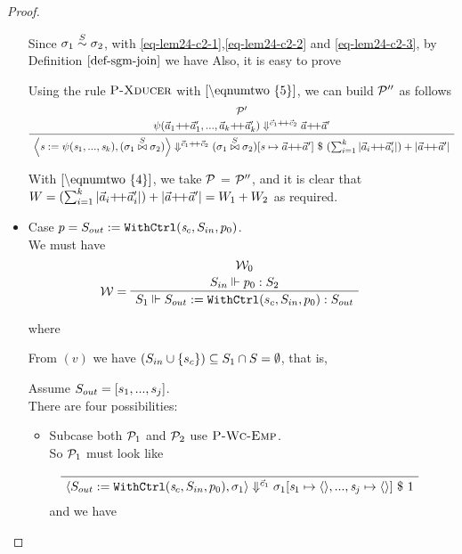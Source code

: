 \begin{proof}
\begin{itemize}
    Since $\sigma_1 \stackrel{S}{\sim} \sigma_2$, 
    with \eqref{eq-lem24-c2-1},\eqref{eq-lem24-c2-2} and \eqref{eq-lem24-c2-3}, 
    by Definition $\ref{def-sgm-join}$ we have
 	Also, it is easy to prove 
 
    Using the rule $\textsc{P-Xducer}$ with $\eqref{\eqnumtwo{5}}$, we can build $\mathcal{P}''$ as follows
   	$$\PT{\UCN{\MP'}{\sevalfg{\lcall}{\a_1  {\++} \a_1',...,\a_k {\++} \a_k' } 
   			{\c_1 {\++} \c_2} {\a {\++} \a'}}
    	\UC{\seval{\casetwo}{\sgmx}{\c_1 {\++} \c_2}{\sgmx[\s \|-> \a {\++} \a']}{(\sum_{i=1}^{k}|\a_i{\++}\a'_i|) + |\a{\++} \a'|}}
    } $$
   
   
    With $\eqref{\eqnumtwo{4}}$, we take $\mathcal{P}$  = $\mathcal{P}''$,
    and it is clear that $W = (\sum_{i=1}^{k}|\a_i{\++}\a'_i|) + |\a{\++} \a'| = W_1 + W_2$ as required.
 
   	

\item Case $p = S_{out} := \mathtt{WithCtrl}(\mathit{s}_c,S_{in},p_0)$.\\
\def\eqnumthree#1{eq-lem24-c3-{#1}}
	We must have  
	$$
		\PT{\UCN{\MW_0}{\wf{p_0}{\Sin}{\S_2}}
			\LeLa{\MW = }		
			\UC{\wf{\withctrl{s_c}{p_0}{\Sin}{\Sout}}{\S_1}{\Sout}}  
	}$$

where  
 
From $(v)$ we have $(S_{in} \cup \{s_c\})  \subseteq S_1 \cap S = \emptyset$, that is,
		
\def\casethree{\withctrl{\s_c}{p_0}{\Sin}{\Sout}}

    Assume $S_{out} = [s_1,...,s_j]$. \\	
    There are four possibilities: 
   
    \begin{itemize}
    	\item Subcase both $\mathcal{P}_1$ and $\mathcal{P}_2$ use $\textsc{P-Wc-Emp}$. \\
    	
    	So $\mathcal{P}_1$ must look like 
    	
    	$$\PT{
    		\Axiom{\seval{\casethree}{\sgm_1}{\c_1}{\sgm_1[\s_1 \|-> \emptyv, ..., \s_j \|-> \emptyv]}{1}}
    	}$$
    	and we have   
    	

\end{itemize}
\end{itemize}
\end{proof}
